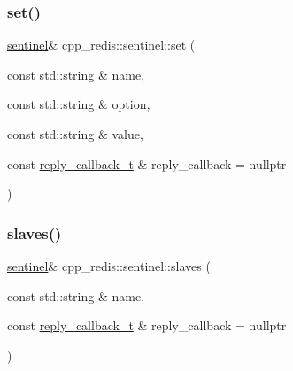 \mbox{\label{classcpp__redis_1_1sentinel_a1579c9c9b8ac3cded0a7d70e709e5e1b}} 
\subsubsection{\texorpdfstring{set()}{set()}}
{\footnotesize\ttfamily \hyperlink{classcpp__redis_1_1sentinel}{sentinel}\& cpp\+\_\+redis\+::sentinel\+::set (\begin{DoxyParamCaption}\item[{const std\+::string \&}]{name,  }\item[{const std\+::string \&}]{option,  }\item[{const std\+::string \&}]{value,  }\item[{const \hyperlink{classcpp__redis_1_1sentinel_ae1a150ff8787208c47414397a061c9a7}{reply\+\_\+callback\+\_\+t} \&}]{reply\+\_\+callback = {\ttfamily nullptr} }\end{DoxyParamCaption})}

\mbox{\label{classcpp__redis_1_1sentinel_aa4b19659807388d276764f9a79132d00}} 
\subsubsection{\texorpdfstring{slaves()}{slaves()}}
{\footnotesize\ttfamily \hyperlink{classcpp__redis_1_1sentinel}{sentinel}\& cpp\+\_\+redis\+::sentinel\+::slaves (\begin{DoxyParamCaption}\item[{const std\+::string \&}]{name,  }\item[{const \hyperlink{classcpp__redis_1_1sentinel_ae1a150ff8787208c47414397a061c9a7}{reply\+\_\+callback\+\_\+t} \&}]{reply\+\_\+callback = {\ttfamily nullptr} }\end{DoxyParamCaption})}

\mbox{\label{classcpp__redis_1_1sentinel_a8e4d231ac89510c337fe97fe9e642785}} 
